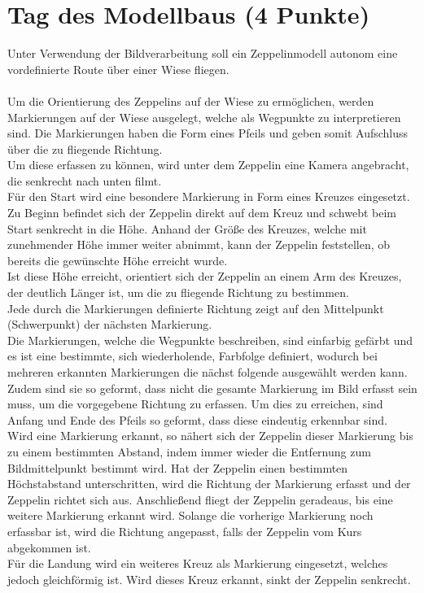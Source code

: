 \documentclass{ezb}
\begin{document}
\section{Tag des Modellbaus (4 Punkte)}
Unter Verwendung der Bildverarbeitung soll ein Zeppelinmodell autonom eine vordefinierte Route über einer Wiese fliegen.\\
\\
Um die Orientierung des Zeppelins auf der Wiese zu ermöglichen, werden Markierungen auf der Wiese ausgelegt, welche als Wegpunkte zu interpretieren sind. Die Markierungen haben die Form eines Pfeils und geben somit Aufschluss über die zu fliegende Richtung.\\
Um diese erfassen zu können, wird unter dem Zeppelin eine Kamera angebracht, die senkrecht nach unten filmt.\\
Für den Start wird eine besondere Markierung in Form eines Kreuzes eingesetzt. Zu Beginn befindet sich der Zeppelin direkt auf dem Kreuz und schwebt beim Start senkrecht in die Höhe. Anhand der Größe des Kreuzes, welche mit zunehmender Höhe immer weiter abnimmt, kann der Zeppelin feststellen, ob bereits die gewünschte Höhe erreicht wurde.\\
Ist diese Höhe erreicht, orientiert sich der Zeppelin an einem Arm des Kreuzes, der deutlich Länger ist, um die zu fliegende Richtung zu bestimmen.\\
Jede durch die Markierungen definierte Richtung zeigt auf den Mittelpunkt (Schwerpunkt) der nächsten Markierung.\\
Die Markierungen, welche die Wegpunkte beschreiben, sind einfarbig gefärbt und es ist eine bestimmte, sich wiederholende, Farbfolge definiert, wodurch bei mehreren erkannten Markierungen die nächst folgende ausgewählt werden kann.\\
Zudem sind sie so geformt, dass nicht die gesamte Markierung im Bild erfasst sein muss, um die vorgegebene Richtung zu erfassen. Um dies zu erreichen, sind Anfang und Ende des Pfeils so geformt, dass diese eindeutig erkennbar sind.\\
Wird eine Markierung erkannt, so nähert sich der Zeppelin dieser Markierung bis zu einem bestimmten Abstand, indem immer wieder die Entfernung zum Bildmittelpunkt bestimmt wird. Hat der Zeppelin einen bestimmten Höchstabstand unterschritten, wird die Richtung der Markierung erfasst und der Zeppelin richtet sich aus. Anschließend fliegt der Zeppelin geradeaus, bis eine weitere Markierung erkannt wird. Solange die vorherige Markierung noch erfassbar ist, wird die Richtung angepasst, falls der Zeppelin vom Kurs abgekommen ist.\\
Für die Landung wird ein weiteres Kreuz als Markierung eingesetzt, welches jedoch gleichförmig ist. Wird dieses Kreuz erkannt, sinkt der Zeppelin senkrecht.
\end{document}
